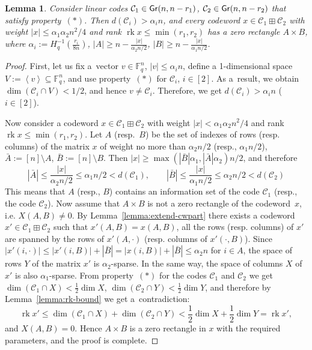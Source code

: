 \documentclass[11pt]{article}
\newcommand{\abr}[1]{\left\langle#1\right\rangle}
\let\le\leqslant
\let\ge\geqslant
\theoremstyle{plain}
\newtheorem{lemma}{Lemma}
\theoremstyle{definition}
\theoremstyle{remark}
\newcommand{\cC}{\mathcal{C}}
\newcommand{\F}{\mathbb{F}}
\DeclareMathOperator{\rk}{rk}
\newcommand{\Gr}{{\sf Gr}}
\begin{document}
\begin{lemma}\label{lemma:no-sparse-lowrank}
    Consider linear codes $\cC_1\in \Gr(n,n-r_1)$, $\cC_2\in\Gr(n, n-r_2)$ that satisfy property~$(*)$. Then $d(\cC_i)> \alpha_i n$, and  every codeword $x\in \cC_1\boxplus \cC_2$ with weight $|x|\le \alpha_1\alpha_2 n^2/4$ and rank $\rk x\le\min(r_1,r_2)$ has a zero rectangle $A\times B$, where $\alpha_i:=H_q^{-1}(\frac{r_i}{8n})$, $|A|\ge n-\frac{|x|}{\alpha_2 n/2}$, $|B|\ge n-\frac{|x|}{\alpha_1 n/2}$.
\end{lemma}
\begin{proof}
    First, let us fix a~vector $v\in\F_q^n$, $|v|\le\alpha_i n$, define a 1-dimensional space $V:=\abr{v}\subseteq \F_q^n$, and use property~$(*)$ for $\cC_i$, $i\in [2]$. As a~result, we obtain $\dim(\cC_i\cap V)<1/2$, and hence $v\ne \cC_i$. Therefore, we get $d(\cC_i)> \alpha_i n$  ($i\in [2]$).

    Now consider a codeword $x\in \cC_1\boxplus \cC_2$ with weight $|x|<\alpha_1\alpha_2n^2/4$ and rank $\rk x\le\min(r_1,r_2)$. Let $A$ (resp.~$B$) be the set of indexes of rows (resp. columns) of the matrix $x$ of weight no more than $\alpha_2 n/2$ (resp., $\alpha_1n/2$), $\bar A:=[n]\setminus A$, $\bar B:=[n]\setminus B$. Then $|x|\ge \max(|\bar B|\alpha_1,|\bar A|\alpha_2) n/2$, and therefore  
    $$|\bar A|\le \frac{|x|}{\alpha_2 n/2}\le \alpha_1n/2<d(\cC_1),\qquad |\bar B|\le \frac{|x|}{\alpha_1 n/2}\le \alpha_2n/2<d(\cC_2)$$
    This means that $A$ (resp., $B$) contains an information set of the code $\cC_1$ (resp., the code $\cC_2$).
    Now assume that $A\times B$ is not a zero rectangle of the codeword~$x$, i.e. $X(A,B)\ne 0$. %
    By Lemma~\ref{lemma:extend-cwpart} there exists a codeword~$x'\in \cC_1\boxplus \cC_2$ such that $x'(A,B)=x(A,B)$, all the rows (resp. columns) of $x'$ are spanned by the rows of $x'(A,\cdot)$ (resp. columns of $x'(\cdot,B)$). 
    Since $|x'(i,\cdot)|\le |x'(i,B)|+|\bar B|=|x(i,B)|+|\bar B|\le \alpha_2 n$ for $i\in A$, the space of rows $Y$ of the matrix $x'$ is $\alpha_2$-sparse. 
    In the same way, the space of columns $X$ of $x'$ is also $\alpha_1$-sparse. From property~$(*)$ for the codes $\cC_1$ and $\cC_2$ we get $\dim (\cC_1\cap X)<\frac12\dim X$, $\dim (\cC_2\cap Y)<\frac12\dim Y$, and therefore by Lemma~\ref{lemma:rk-bound} we get a~contradiction:
    $$\rk x'\le \dim(\cC_1\cap X)+\dim(\cC_2\cap Y) < \frac12\dim X+\frac12\dim Y=\rk x',$$
    and $X(A,B)=0$. Hence $A\times B$ is a zero rectangle in $x$ with the required parameters, and the proof is complete.
\end{proof}
\end{document}
